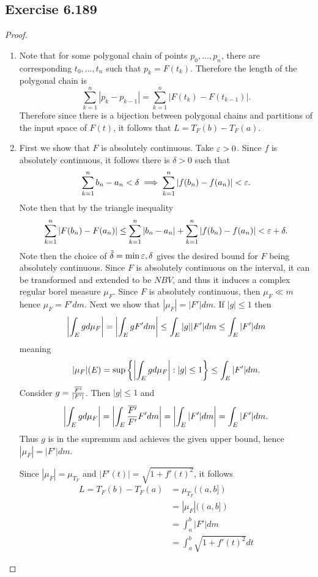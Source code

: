 \documentclass[hw_all.tex]{subfiles}
\begin{document}
\subsection{Exercise 6.189}
\begin{proof}
    \begin{enumerate}
        \item
            Note that for some polygonal chain of points $p_0, \ldots, p_n$, there are corresponding $t_0, \ldots, t_n$ such that $p_k = F(t_k)$. Therefore the length of the polygonal chain is
            \[
                \sum_{k=1}^n |p_k - p_{k-1}| = \sum_{k=1}^n |F(t_k) - F(t_{k-1})|
            .\]
            Therefore since there is a bijection between polygonal chains and partitions of the input space of $F(t)$, it follows that $L = T_{F}(b) - T_{F}(a)$.

        \item 
            First we show that $F$ is absolutely continuous. Take $\varepsilon > 0$. Since $f$ is absolutely continuous, it follows there is $\delta > 0$ such that
            \[
                \sum_{k=1}^n b_n - a_n < \delta \implies \sum_{k=1}^n |f(b_n) - f(a_n)| < \varepsilon
            .\]
            Note then that by the triangle inequality
            \[
                \sum_{k=1}^n |F(b_n) - F(a_n)| \leq \sum_{k = 1}^n |b_n - a_n| + \sum_{k = 1}^n |f(b_n) - f(a_n)| < \varepsilon + \delta
            .\]
            Note then the choice of $\tilde{\delta} = \min{\varepsilon, \delta}$ gives the desired bound for $F$ being absolutely continuous. Since $F$ is absolutely continuous on the interval, it can be transformed and extended to be $NBV$, and thus it induces a complex regular borel measure $\mu_F$. Since $F$ is absolutely continuous, then $\mu_F \ll m$ hence $\mu_F = F' dm$. Next we show that $|\mu_F| = |F'| dm$. If $|g| \leq 1$ then
            \[
                \qty|\int_E g d \mu_F| = \qty|\int_E g F' d m| \leq \int_E |g| |F'| d m \leq \int_E |F'| d m
            \]
            meaning
            \[
                |\mu_F|(E) = \sup\qty{\qty|\int_E g d \mu_F| : |g| \leq 1} \leq \int_E |F'| d m
            .\]
            Consider $g = \frac{\overline{F'}}{|F'|}$. Then $|g| \leq 1$ and
            \[
                \qty|\int_E g d \mu_F| = \qty|\int_E \frac{\overline{F'}}{F'} F' d m| = \left|\int_E |F'| d m \right| = \int_E |F'| d m
            .\]
            Thus $g$ is in the supremum and achieves the given upper bound, hence $|\mu_F| = |F'| d m$.

            Since $|\mu_F| = \mu_{T_F}$ and $|F'(t)| = \sqrt{1 + f'(t)^2}$, it follows
            \begin{align*}
                L = T_F(b) - T_F(a) &= \mu_{T_F}((a,b]) \\
                                    &= |\mu_F|((a,b])  \\
                                    &= \int_a^b |F'| d m \\
                                    &= \int_a^b \sqrt{1 + f'(t)^2} d t
            \end{align*}
    \end{enumerate}
\end{proof}
\end{document}
